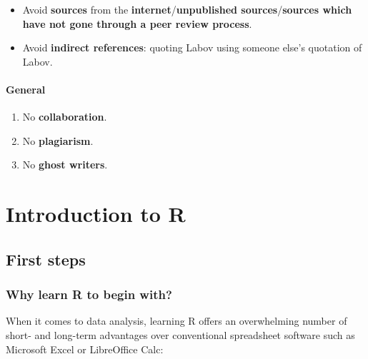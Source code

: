 \documentclass[
  11pt,
  letterpaper,
  DIV=11,
  numbers=noendperiod]{scrreprt}
\providecommand{\tightlist}{%
  \setlength{\itemsep}{0pt}\setlength{\parskip}{0pt}}\usepackage{longtable,booktabs,array}
\begin{document}
\begin{itemize}
\tightlist
\item
  Avoid \textbf{sources} from the \textbf{internet}/\textbf{unpublished
  sources}/\textbf{sources which have not gone through a peer review
  process}.
\item
  Avoid \textbf{indirect references}: quoting Labov using someone else's
  quotation of Labov.
\end{itemize}

\subsection{General}\label{general}

\begin{enumerate}
\def\labelenumi{\arabic{enumi}.}
\tightlist
\item
  No \textbf{collaboration}.
\item
  No \textbf{plagiarism}.
\item
  No \textbf{ghost writers}.
\end{enumerate}

\part{Introduction to R}

\chapter{First steps}\label{first-steps}

\section{Why learn R to begin with?}\label{why-learn-r-to-begin-with}

When it comes to data analysis, learning R offers an overwhelming number
of short- and long-term advantages over conventional spreadsheet
software such as Microsoft Excel or LibreOffice Calc:
\end{document}

